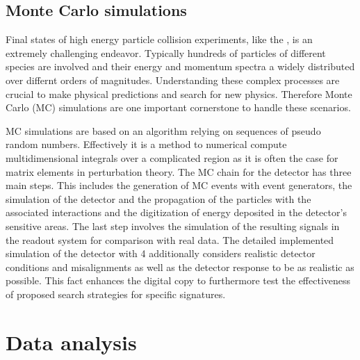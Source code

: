 \section{Monte Carlo simulations}
Final states of high energy particle collision experiments, like the {\LHC}, is an extremely challenging endeavor. Typically hundreds of particles of different species are involved and their energy and momentum spectra a widely distributed over differnt orders of magnitudes. Understanding these complex processes are crucial to make physical predictions and search for new physics. Therefore Monte Carlo (MC) simulations are one important cornerstone to handle these scenarios. \cite{bigMC}\par
MC simulations are based on an algorithm relying on sequences of pseudo random numbers. Effectively it is a method to numerical compute multidimensional integrals over a complicated region as it is often the case for matrix elements in perturbation theory. \cite{MCbook} The MC chain for the {\ATLAS} detector has three main steps. This includes the generation of MC events with event generators, the simulation of the detector and the propagation of the particles with the associated interactions and the digitization of energy deposited in the detector's sensitive areas. The last step involves the simulation of the resulting signals in the readout system for comparison with real data. The detailed implemented simulation of the detector with {\GEANT}4\cite{GEANT4} additionally considers realistic detector conditions and misalignments as well as the detector response to be as realistic as possible. This fact enhances the digital copy to furthermore test the effectiveness of proposed search strategies for specific signatures. \cite{ATLASSim}
\chapter{Data analysis}
